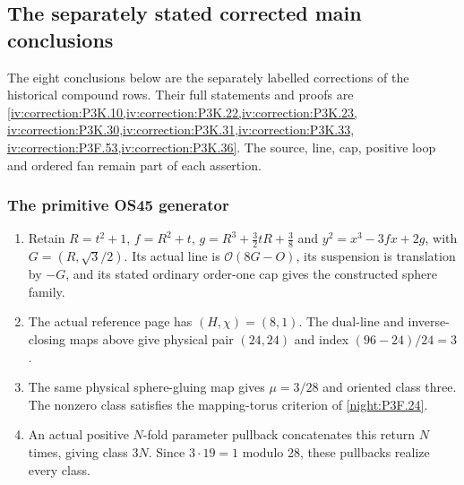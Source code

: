 \subsection{The separately stated corrected main conclusions}
The eight conclusions below are the separately labelled corrections of
the historical compound rows. Their full statements and proofs are
\cref{iv:correction:P3K.10,iv:correction:P3K.22,iv:correction:P3K.23,
iv:correction:P3K.30,iv:correction:P3K.31,iv:correction:P3K.33,
iv:correction:P3F.53,iv:correction:P3K.36}. The source, line, cap,
positive loop and ordered fan remain part of each assertion.

\subsubsection{The primitive OS45 generator}
\RungOne
\begin{enumerate}[label=\arabic*.]
\item Retain $R=t^2+1$, $f=R^2+t$,
  $g=R^3+\tfrac32tR+\tfrac38$ and
  $y^2=x^3-3fx+2g$, with $G=(R,\sqrt3/2)$.
  Its actual line is $\mathcal O(8G-O)$, its suspension is
  translation by $-G$, and its stated ordinary order-one cap
  gives the constructed sphere family.
\item The actual reference page has $(H,\chi)=(8,1)$.
  The dual-line and inverse-closing maps above give physical
  pair $(24,24)$ and index $(96-24)/24=3$.
\item The same physical sphere-gluing map gives
  $\mu=3/28$ and oriented class three. The nonzero class
  satisfies the mapping-torus criterion of \cref{night:P3F.24}.
\item An actual positive $N$-fold parameter pullback concatenates
  this return $N$ times, giving class $3N$. Since
  $3\cdot19=1$ modulo 28, these pullbacks realize every class.
\end{enumerate}

